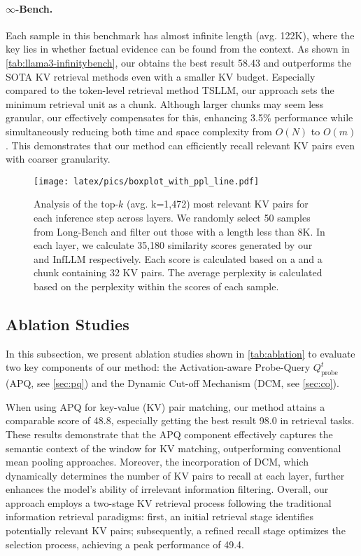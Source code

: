  
 \vspace{-0.5em}
\paragraph{$\infty$-Bench.} Each sample in this benchmark has almost infinite length (avg. 122K), where the key lies in whether factual evidence can be found from the context. As shown in \cref{tab:llama3-infinitybench}, our \name obtains the best result 58.43 and outperforms the SOTA KV retrieval methods even with a smaller KV budget. Especially compared to the token-level retrieval method TSLLM, our approach sets the minimum retrieval unit as a chunk. Although larger chunks may seem less granular, our \pq effectively compensates for this, enhancing 3.5\% performance while simultaneously reducing both time and space complexity from $O(N)$ to $O(m)$. This demonstrates that our method can efficiently recall relevant KV pairs even with coarser granularity.



\begin{figure*}[!ht] 
\vspace{-0.5em}
    \centering
        \texttt{[image: latex/pics/boxplot\_with\_ppl\_line.pdf]}
    \caption{Analysis of the top-$k$  (avg. k=1,472) most relevant KV pairs for each inference step across layers. We randomly select 50 samples from Long-Bench and filter out those with a length less than 8K. In each layer, we calculate 35,180 similarity scores generated by our \name and InfLLM respectively. Each score is calculated based on a \pq and a chunk containing 32 KV pairs. The average perplexity is calculated based on the perplexity within the scores of each sample.
    } 
    \label{fig:analysis}
\end{figure*}

\subsection{Ablation Studies}
\label{sec:ablation}
In this subsection, we present ablation studies shown in \cref{tab:ablation} to evaluate two key components of our method: the Activation-aware Probe-Query $Q_\text{probe}^t$ (APQ, see \cref{sec:pq}) and the Dynamic Cut-off Mechanism (DCM, see \cref{sec:co}). 

When using APQ for key-value (KV) pair matching, our method attains a comparable score of 48.8, especially getting the best result 98.0 in retrieval tasks. These results demonstrate that the APQ component effectively captures the semantic context of the window for KV matching, outperforming conventional mean pooling approaches. Moreover, the incorporation of DCM, which dynamically determines the number of KV pairs to recall at each layer, further enhances the model’s ability of irrelevant information filtering. Overall, our approach employs a two-stage KV retrieval process following the traditional information retrieval paradigms: first, an initial retrieval stage identifies potentially relevant KV pairs; subsequently, a refined recall stage optimizes the selection process, achieving a peak performance of 49.4.

